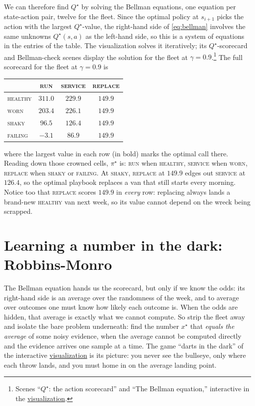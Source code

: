 \documentclass[11pt,a4paper]{article}
\theoremstyle{definition}
\theoremstyle{remark}
\numberwithin{equation}{section}
\newcommand{\sa}[1]{\textsc{#1}}   %
\newcommand{\vizhref}[1]{\href{https://eth-ainit-fs26.github.io/rl-arcade/repair-or-replace/}{#1}}
\begin{document}
We can therefore find $Q^\star$ by solving the Bellman equations, one equation per
state-action pair, twelve for the fleet. Since the optimal policy at $s_{i+1}$ picks the
action with the largest $Q^\star$-value, the right-hand side of \eqref{eq:bellman} involves
the same unknowns $Q^\star(s, a)$ as the left-hand side, so this is a system of equations in
the entries of the table. The visualization solves it iteratively; its $Q^\star$-scorecard
and Bellman-check scenes display the solution for the fleet at
$\gamma = 0.9$.\footnote{Scenes ``$Q^\star$: the action scorecard'' and ``The Bellman
equation,'' interactive in the \vizhref{visualization}.} The full scorecard for the fleet at
$\gamma = 0.9$ is
\begin{center}
\begin{tabular}{lccc}
\toprule
 & \sa{run} & \sa{service} & \sa{replace} \\
\midrule
\sa{healthy} & $\mathbf{311.0}$ & $229.9$          & $149.9$ \\
\sa{worn}    & $203.4$          & $\mathbf{226.1}$ & $149.9$ \\
\sa{shaky}   & $96.5$           & $126.4$          & $\mathbf{149.9}$ \\
\sa{failing} & $-3.1$           & $86.9$           & $\mathbf{149.9}$ \\
\bottomrule
\end{tabular}
\end{center}
where the largest value in each row (in bold) marks the optimal call there. Reading down those
crowned cells, $\pi^\star$ is: \sa{run} when \sa{healthy}, \sa{service} when \sa{worn},
\sa{replace} when \sa{shaky} or \sa{failing}. At \sa{shaky}, \sa{replace} at $149.9$ edges out
\sa{service} at $126.4$, so the optimal playbook replaces a van that still starts every
morning. Notice too that \sa{replace} scores $149.9$ in \emph{every} row: replacing always
lands a brand-new \sa{healthy} van next week, so its value cannot depend on the wreck being
scrapped.

\section{Learning a number in the dark: Robbins-Monro}\label{sec:rm}

The Bellman equation hands us the scorecard, but only if we know the odds: its right-hand side
is an average over the randomness of the week, and to average over outcomes one must know how
likely each outcome is. When the odds are hidden, that average is exactly what we cannot
compute. So strip the fleet away and isolate the bare problem underneath: find the number
$x^\star$ that \emph{equals the average} of some noisy evidence, when the average cannot be
computed directly and the evidence arrives one sample at a time. The game ``darts in the
dark'' of the interactive \vizhref{visualization} is its picture: you never see the bullseye,
only where each throw lands, and you must home in on the average landing point.
\end{document}
